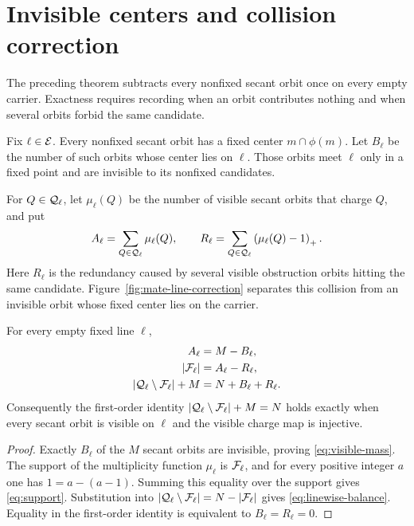\section{Invisible centers and collision correction}

The preceding theorem subtracts every nonfixed secant orbit once on every
empty carrier.  Exactness requires recording when an orbit contributes
nothing and when several orbits forbid the same candidate.

Fix $\ell\in\mathcal{E}$.  Every nonfixed secant orbit has a fixed center
$m\cap\phi(m)$.  Let $B_\ell$ be the number of such orbits whose center
lies on $\ell$.  Those orbits meet $\ell$ only in a fixed point and are
invisible to its nonfixed candidates.

For $Q\in\mathcal{Q}_\ell$, let $\mu_\ell(Q)$ be the number of visible secant
orbits that charge $Q$, and put
\[
 A_\ell=\sum_{Q\in\mathcal{Q}_\ell}\mu_\ell(Q),
 \qquad
 R_\ell=\sum_{Q\in\mathcal{Q}_\ell}
     \left(\mu_\ell(Q)-1\right)_{+}.
\]
Here $R_\ell$ is the redundancy caused by several visible obstruction
orbits hitting the same candidate.
Figure~\ref{fig:mate-line-correction} separates this collision from an
invisible orbit whose fixed center lies on the carrier.



\begin{proposition}\label{prop:linewise}
For every empty fixed line $\ell$,
\begin{align}
 A_\ell&=M-B_\ell,\label{eq:visible-mass}\\
 |\mathcal{F}_\ell|&=A_\ell-R_\ell,\label{eq:support}\\
 |\mathcal{Q}_\ell\setminus\mathcal{F}_\ell|+M
   &=N+B_\ell+R_\ell.\label{eq:linewise-balance}
\end{align}
Consequently the first-order identity
$|\mathcal{Q}_\ell\setminus\mathcal{F}_\ell|+M=N$ holds exactly when every secant orbit is
visible on $\ell$ and the visible charge map is injective.
\end{proposition}

\begin{proof}
Exactly $B_\ell$ of the $M$ secant orbits are invisible, proving
\eqref{eq:visible-mass}.  The support of the multiplicity function
$\mu_\ell$ is $\mathcal{F}_\ell$, and for every positive integer $a$ one has
$1=a-(a-1)$.  Summing this equality over the support gives
\eqref{eq:support}.  Substitution into
$|\mathcal{Q}_\ell\setminus\mathcal{F}_\ell|=N-|\mathcal{F}_\ell|$ gives
\eqref{eq:linewise-balance}.  Equality in the first-order identity is
equivalent to $B_\ell=R_\ell=0$.
\end{proof}


